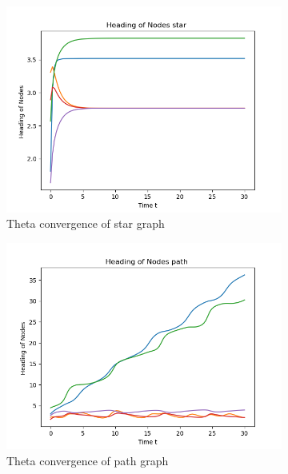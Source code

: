 \documentclass{article}
\begin{document}
\begin{problem}
\begin{figure}[!h]
\begin{subfigure}{0.35\textwidth}
            \includegraphics[width=\textwidth]{./img/p3_star2.png}
            \caption{Theta convergence of star graph }
        \end{subfigure}
        \begin{subfigure}{0.35\textwidth}
            \includegraphics[width=\textwidth]{./img/p3_path2.png}
            \caption{Theta convergence of path graph }
        \end{subfigure}
        \begin{subfigure}{0.35\textwidth}

\end{subfigure}
\end{figure}
\end{problem}
\end{document}
